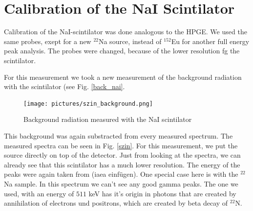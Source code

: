 \section{Calibration of the NaI Scintilator}

Calibration of the NaI-scintilator was done analogous to the HPGE.
We used the same probes, exept for a new $^{22}$Na source, instead of $^{152}$Eu for another full energy peak analysis.
The probes were changed, because of the lower resolution fg the scintilator.

For this measurement we took a new measurement of the background radiation with the scintilator (see Fig. \ref{back_nai}.

\begin{figure}[h]
  \texttt{[image: pictures/szin\_background.png]}
  \caption{Background radiation measured with the NaI scintilator}
  \label{nai_untergrund}
\end{figure}

This background was again substracted from every measured spectrum.
The measured spectra can be seen in Fig. \ref{szin}.
For this measurement, we put the source directly on top of the detector.
Just from looking at the spectra, we can already see that this scintilator has a much lower resolution.
The energy of the peaks were again taken from (iaea einfügen).
One special case here is with the $^{22}$Na sample.
In this spectrum we can't see any good gamma peaks.
The one we used, with an energy of $511$ keV has it's origin in photons that are created by annihilation of electrons und positrons, which are created by beta decay of $^{22}$N.

